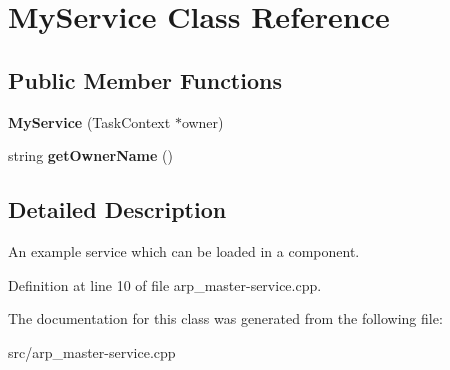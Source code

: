 \hypertarget{classMyService}{
\section{MyService Class Reference}
\label{classMyService}
}
\subsection*{Public Member Functions}
\begin{DoxyCompactItemize}
\item 
\hypertarget{classMyService_a8db2133b0b03855f3871b9c63da03c67}{
{\bfseries MyService} (TaskContext $\ast$owner)}
\label{classMyService_a8db2133b0b03855f3871b9c63da03c67}

\item 
\hypertarget{classMyService_aba1bfbd0c03b725b646ac48754a699fd}{
string {\bfseries getOwnerName} ()}
\label{classMyService_aba1bfbd0c03b725b646ac48754a699fd}

\end{DoxyCompactItemize}


\subsection{Detailed Description}
An example service which can be loaded in a component. 

Definition at line 10 of file arp\_\-master-\/service.cpp.



The documentation for this class was generated from the following file:\begin{DoxyCompactItemize}
\item 
src/arp\_\-master-\/service.cpp\end{DoxyCompactItemize}
